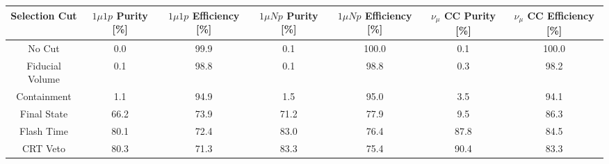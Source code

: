 \begin{tabular}{ccccccc}
\toprule
Selection Cut & $1\mu1p$ Purity [\%] & $1\mu1p$ Efficiency [\%] & $1\mu Np$ Purity [\%] & $1\mu Np$ Efficiency [\%] & $\nu_\mu$ CC Purity [\%] & $\nu_\mu$ CC Efficiency [\%] \\
\midrule
No Cut & 0.0 & 99.9 & 0.1 & 100.0 & 0.1 & 100.0 \\
Fiducial Volume & 0.1 & 98.8 & 0.1 & 98.8 & 0.3 & 98.2 \\
Containment & 1.1 & 94.9 & 1.5 & 95.0 & 3.5 & 94.1 \\
Final State & 66.2 & 73.9 & 71.2 & 77.9 & 9.5 & 86.3 \\
Flash Time & 80.1 & 72.4 & 83.0 & 76.4 & 87.8 & 84.5 \\
CRT Veto & 80.3 & 71.3 & 83.3 & 75.4 & 90.4 & 83.3 \\
\bottomrule
\end{tabular}